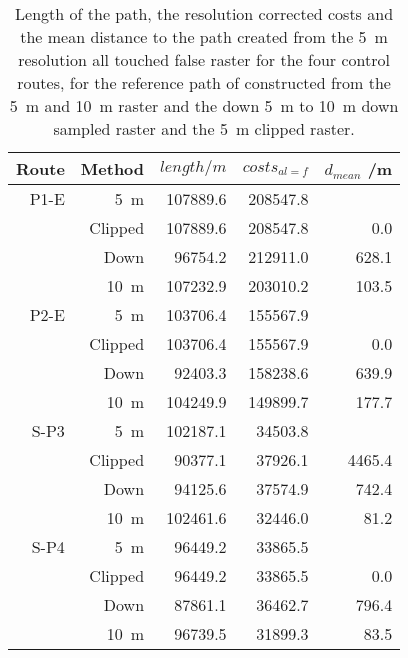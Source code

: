 \begin{table}[h!]
	\caption{Length of the path, the resolution corrected costs and the mean distance to the path created from the 5~m resolution all touched false raster for the four control routes, for the reference path of constructed from the 5~m  and 10~m raster and the down 5~m to 10~m down sampled raster and the 5~m clipped raster.}
	\label{tab:6}
	\centering
	\begin{tabular}{ r @{\hspace*{3mm}}  r  r  r  r}
		Route & Method & $length /m$ & $costs_{al=f}$ & $d_{mean}$ /m \\
		\hline
		P1-E & 5~m 			& 107889.6 & 208547.8 &        \\
		 	 & Clipped 		& 107889.6 & 208547.8 &   0.0  \\
		 	 & Down			&  96754.2 & 212911.0 & 628.1 \\
		 	 & 10~m 		& 107232.9 & 203010.2 & 103.5 \\
		\hline
		P2-E & 5~m 			& 103706.4 & 155567.9 &        \\
		 	 & Clipped 		& 103706.4 & 155567.9 &   0.0 \\
		 	 & Down 	    &  92403.3 & 158238.6	& 639.9 \\
		 	 & 10~m 		& 104249.9 & 149899.7 & 177.7 \\
		\hline
		S-P3 & 5~m 			& 102187.1 & 34503.8 	&         \\
			 & Clipped 		&  90377.1 & 37926.1 	& 4465.4 \\
			 & Down 	    &  94125.6 & 37574.9 	&  742.4 \\
			 & 10~m 		& 102461.6 & 32446.0 	&   81.2 \\
		\hline
		S-P4 & 5~m 			& 96449.2 	& 33865.5 	&  		\\
		 	 & Clipped 		& 96449.2 	& 33865.5 	& 0.0 	\\
			 & Down 		& 87861.1 	& 36462.7 	& 796.4\\
			 & 10~m 		& 96739.5 	& 31899.3	& 83.5 \\

		
	\end{tabular}
\end{table}



